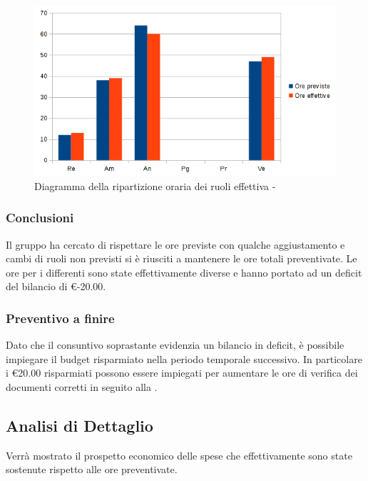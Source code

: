 \documentclass[12pt,a4paper]{article}
\begin{document}
\begin{center}
	\begin{figure}[H]
		\centering
		\includegraphics[width=\textwidth]{../img/diagrammaBarreAnalisiConsuntivo.png}
		\caption{Diagramma della ripartizione oraria dei ruoli effettiva - \FA{}}
	\end{figure}
\end{center}

\subsubsection{Conclusioni}
Il gruppo ha cercato di rispettare le ore previste con qualche aggiustamento e cambi di ruoli non previsti si è riusciti a mantenere le ore totali preventivate. Le ore per i differenti  sono state effettivamente diverse e hanno portato ad un deficit del bilancio di \euro{}-20.00.

\subsubsection{Preventivo a finire}
\label{sec:paf-analisi}
Dato che il consuntivo soprastante evidenzia un bilancio in deficit, è possibile impiegare il budget risparmiato nella periodo temporale successivo. In particolare i \euro{}20.00 risparmiati possono essere impiegati per aumentare le ore di verifica dei documenti corretti in seguito alla \RR{}.

\newpage

\subsection{Analisi di Dettaglio}
Verrà mostrato il prospetto economico delle spese che effettivamente sono state sostenute rispetto alle ore preventivate.
\end{document}
